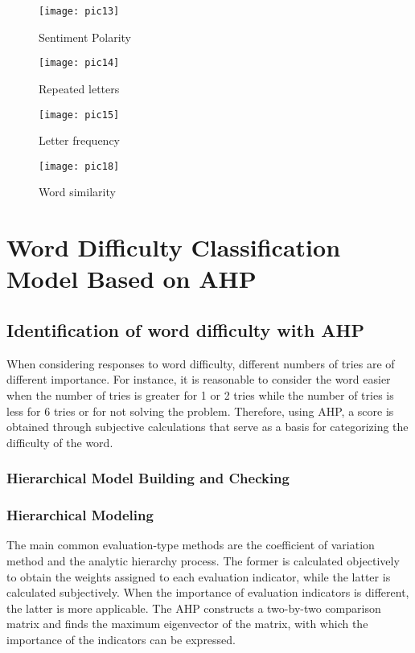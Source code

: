 \documentclass[12pt]{article}  %
\begin{document}
\begin{figure}[htbp]
	\centering
	\begin{minipage}{0.49\linewidth}
		\centering
		\texttt{[image: pic13]}
		\caption{Sentiment Polarity}
		\label{pic13}%
	\end{minipage}
	\begin{minipage}{0.49\linewidth}
		\centering
		\texttt{[image: pic14]}
		\caption{Repeated letters}
		\label{pic14}%
	\end{minipage}
	
	\begin{minipage}{0.49\linewidth}
		\centering
		\texttt{[image: pic15]}
		\caption{Letter frequency}
		\label{pic15}%
	\end{minipage}
	\begin{minipage}{0.49\linewidth}
		\centering
		\texttt{[image: pic18]}
		\caption{Word similarity}
		\label{pic18}%
	\end{minipage}
\end{figure}

\section{Word Difficulty Classification Model Based on AHP}
\subsection{Identification of word difficulty with AHP}
When considering responses to word difficulty, different numbers of tries are of different importance. For instance, it is reasonable to consider the word easier when the number of tries is greater for 1 or 2 tries while the number of tries is less for 6 tries or for not solving the problem. Therefore, using AHP, a score is obtained through subjective calculations that serve as a basis for categorizing the difficulty of the word.

\subsubsection{Hierarchical Model Building and Checking}
\subsubsection*{Hierarchical Modeling}
The main common evaluation-type methods are the coefficient of variation method and the analytic hierarchy process. The former is calculated objectively to obtain the weights assigned to each evaluation indicator, while the latter is calculated subjectively. When the importance of evaluation indicators is different, the latter is more applicable. The AHP constructs a two-by-two comparison matrix and finds the maximum eigenvector of the matrix, with which the importance of the indicators can be expressed.
\end{document}

